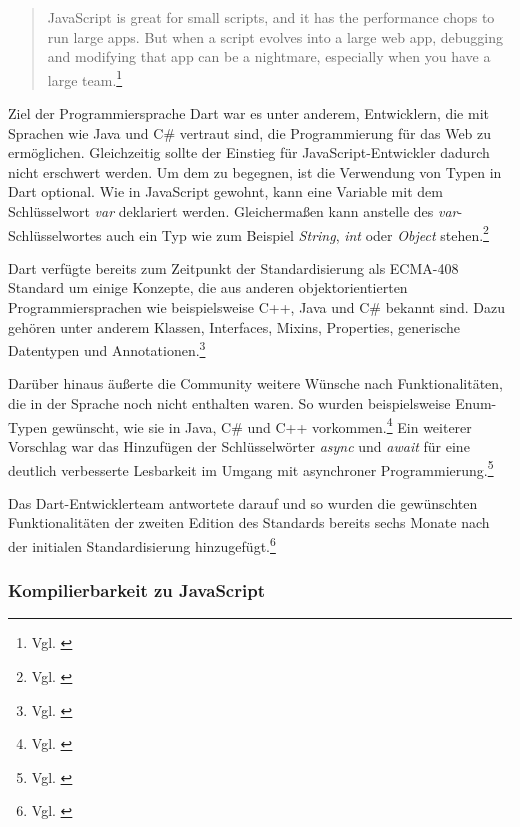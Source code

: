 \begin{quote}
JavaScript is great for small scripts, and it has the performance chops to run large apps. But when a script evolves into a large web app, debugging and modifying that app can be a nightmare, especially when you have a large team.\footnote{Vgl. \cite[S. 1]{walrath2012dart}}
\end{quote}

Ziel der Programmiersprache Dart war es unter anderem, Entwicklern, die mit Sprachen wie Java und C\# vertraut sind, die Programmierung für das Web zu ermöglichen. Gleichzeitig sollte der Einstieg für JavaScript-Entwickler dadurch nicht erschwert werden. Um dem zu begegnen, ist die Verwendung von Typen in Dart optional. Wie in JavaScript gewohnt, kann eine Variable mit dem Schlüssel\-wort \textit{var} deklariert werden. Gleichermaßen kann anstelle des \textit{var}-Schlüssel\-wortes auch ein Typ wie zum Beispiel \textit{String}, \textit{int} oder \textit{Object} stehen.\footnote{Vgl. \cite[S. 5]{buckett2013dart}}

Dart verfügte bereits zum Zeitpunkt der Standardisierung als ECMA-408 Standard um einige Konzepte, die aus anderen objekt\-orientierten Programmier\-sprachen wie beispielsweise C++, Java und C\# bekannt sind. Dazu gehören unter anderem Klassen, Interfaces, Mixins, Properties, generische Daten\-typen und Annotationen.\footnote{Vgl. \cite[o. S.]{EcmaDartProgrammingLanguageSpecificationFirstEdition}}

Darüber hinaus äußerte die Community weitere Wünsche nach Funktionalitäten, die in der Sprache noch nicht enthalten waren. So wurden beispielsweise Enum-Typen gewünscht, wie sie in Java, C\# und C++ vorkommen.\footnote{Vgl. \cite{EnhancementEnumDart}}
Ein weiterer Vorschlag war das Hinzufügen der Schlüsselwörter \textit{async} und \textit{await} für eine deutlich verbesserte Lesbar\-keit im Umgang mit asynchroner Programmierung.\footnote{Vgl. \cite{SupportForAwaitInDart}}

Das Dart-Entwicklerteam antwortete darauf und so wurden die gewünschten Funktionalitäten der zweiten Edition des Standards bereits sechs Monate nach der initialen Standardisierung hinzugefügt.\footnote{Vgl. \cite[S. 43, 88]{EcmaDartProgrammingLanguageSpecificationSecondEdition}}


\subsubsection{Kompilierbarkeit zu JavaScript}

